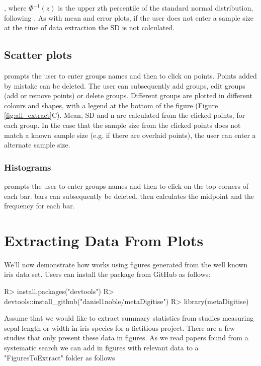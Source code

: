 \documentclass[article]{jss}
\newcommand{\fct}[1]{\code{#1()}}
\begin{document}
, where $\Phi^{-1}(z)$ is the upper zth percentile of the standard normal distribution, following \citet{Wan2014}. As with mean and error plots, if the user does not enter a sample size at the time of data extraction the SD is not calculated.

\subsection{Scatter plots}
 \fct{metaDigitise} prompts the user to enter groups names and then to click on points. Points added by mistake can be deleted. The user can subsequently add groups, edit groups (add or remove points) or delete groups. Different groups are plotted in different colours and shapes, with a legend at the bottom of the figure (Figure \ref{fig:all_extract}C). Mean, SD and n are calculated from the clicked points, for each group. In the case that the sample size from the clicked points does not match a known sample size (e.g. if there are overlaid points), the user can enter a alternate sample size.

\subsubsection{Histograms}
 prompts the user to enter groups names and then to click on the top corners of each bar. bars can subsequently be deleted.  then calculates the midpoint and the frequency for each bar. 





\section{Extracting Data From Plots}


We'll now demonstrate how \fct{metaDigitise} works using figures generated from the well known iris data set. Users can install the  package from GitHub as follows:

\begin{CodeChunk}
\begin{CodeInput}
R> install.packages("devtools")
R> devtools::install_github("daniel1noble/metaDigitise")
R> library(metaDigitise)
\end{CodeInput}
\end{CodeChunk}

Assume that we would like to extract summary statistics from studies measuring sepal length or width in iris species for a fictitious project. There are a few studies that only present these data in figures. As we read papers found from a systematic search we can add in figures with relevant data to a "FiguresToExtract" folder as follows
\end{document}
